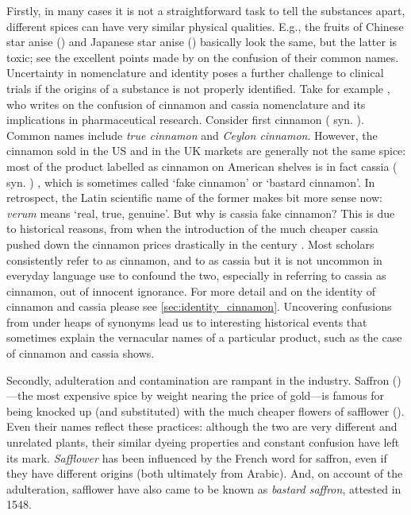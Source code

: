 Firstly, in many cases it is not a straightforward task to tell the substances apart, different spices can have very similar physical qualities. E.g., the fruits of Chinese star anise () and Japanese star anise () basically look the same, but the latter is toxic; see the excellent points made by \textcite{small_confusion_1996} on the confusion of their common names. Uncertainty in nomenclature and identity poses a further challenge to clinical trials if the origins of a substance is not properly identified. Take for example \textcite{oketch-rabah_cinnamon_2018}, who writes on the confusion of cinnamon and cassia nomenclature and its implications in pharmaceutical research. Consider first cinnamon ( syn. ). Common names include \textit{true cinnamon} and \textit{Ceylon cinnamon}. However, the cinnamon sold in the US and in the UK markets are generally not the same spice: most of the product labelled as cinnamon on American shelves is in fact cassia ( syn. ) \autocite{oketch-rabah_cinnamon_2018}, which is sometimes called `fake cinnamon' or `bastard cinnamon'. In retrospect, the Latin scientific name of the former makes bit more sense now: \textit{verum} means `real, true, genuine'. But why is cassia fake cinnamon? This is due to historical reasons, from when the introduction of the much cheaper cassia pushed down the cinnamon prices drastically in the  century \autocite{wijesekera_chemistry_1978}. Most scholars consistently refer to  as cinnamon, and to  as cassia but it is not uncommon in everyday language use to confound the two, especially in referring to cassia as cinnamon, out of innocent ignorance. For more detail and on the identity of cinnamon and cassia please see \cref{sec:identity_cinnamon}. Uncovering confusions from under heaps of synonyms lead us to interesting historical events that sometimes explain the vernacular names of a particular product, such as the case of cinnamon and cassia shows. 

Secondly, adulteration and contamination are rampant in the industry. Saffron ()---the most expensive spice by weight nearing the price of gold---is famous for being knocked up (and substituted) with the much cheaper flowers of safflower (). Even their names reflect these practices: although the two are very different and unrelated plants, their similar dyeing properties and constant confusion have left its mark. \textit{Safflower} has been influenced by the French word for saffron, even if they have different origins (both ultimately from Arabic). And, on account of the adulteration, safflower have also came to be known as \textit{bastard saffron}, attested in 1548. 

